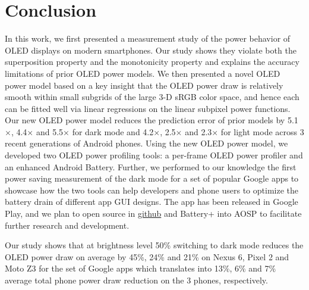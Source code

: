 \section{Conclusion}
\label{sec:conc}

In this work, we first presented a measurement study of the power behavior
of OLED displays on modern smartphones.
Our study shows they violate both the
superposition property and the monotonicity property and explains the
accuracy limitations of prior OLED power models. We then presented a
novel OLED power model based on a key
insight that the OLED power draw is relatively smooth within small
subgrids of the large 3-D sRGB color space, and hence each can be fitted
well via linear regressions on the linear subpixel power functions.
Our new OLED power model reduces the prediction error of prior models
by
    5.1$\times$, 4.4$\times$ and 5.5$\times$ for dark mode
    and 4.2$\times$, 2.5$\times$ and 2.3$\times$ for light mode
across 3 recent generations of Android phones.
Using the new OLED power model, we developed two OLED power
profiling tools: a per-frame OLED power profiler and an enhanced Android Battery.
%
Further, we performed to our knowledge the first power saving
measurement of the  dark mode for a set of popular Google
apps to showcase how the two tools can help developers
and phone users to optimize the battery drain of
different app GUI designs.
The \appwithlink app
has been released in Google Play, and
we
plan to open source \name in \url{github} and Battery+ into AOSP
to facilitate further research and development.



Our study shows that at brightness level 50\%
switching to dark mode reduces the OLED
power draw on average by 45\%, 24\% and 21\% on Nexus 6,
Pixel 2 and Moto Z3 for the set of
Google apps which translates into 13\%, 6\% and 7\%
average total phone power draw reduction on the 3 phones, respectively.
\fi
